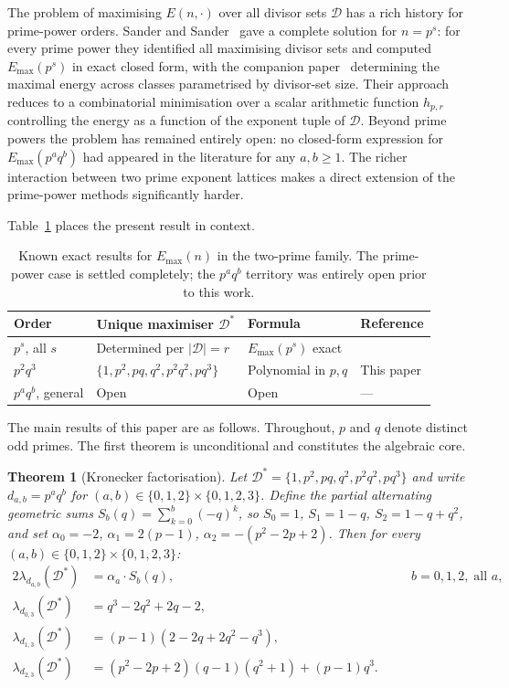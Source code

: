 \documentclass[12pt,a4paper]{article}
\theoremstyle{plain}
\newtheorem{theorem}{Theorem}[section]
\theoremstyle{definition}
\newcommand{\Emax}{E_{\max}}
\newcommand{\Dstar}{\mathcal{D}^*}
\begin{document}
The problem of maximising $E(n,\cdot)$ over all divisor sets $\mathcal{D}$
has a rich history for prime-power orders.  Sander and
Sander~\cite{SanderS2011a,SanderS2011b,SanderS2013} gave a complete
solution for $n=p^s$: for every prime power they identified all maximising
divisor sets and computed $\Emax(p^s)$ in exact closed form, with the
companion paper~\cite{SanderS2012} determining the maximal energy across
classes parametrised by divisor-set size.  Their approach reduces to a
combinatorial minimisation over a scalar arithmetic function $h_{p,r}$
controlling the energy as a function of the exponent tuple of $\mathcal{D}$.
Beyond prime powers the problem has remained entirely open: no closed-form
expression for $\Emax(p^aq^b)$ had appeared in the literature for any
$a,b\ge1$.  The richer interaction between two prime exponent lattices
makes a direct extension of the prime-power methods significantly harder.

Table~\ref{tab:known} places the present result in context.

\begin{table}[h]
\centering
\caption{Known exact results for $\Emax(n)$ in the two-prime family.
The prime-power case is settled completely; the $p^aq^b$ territory was
entirely open prior to this work.}
\label{tab:known}
\begin{tabular}{llll}
\toprule
Order & Unique maximiser $\Dstar$ & Formula & Reference \\
\midrule
$p^s$, all $s$ & Determined per $|\mathcal{D}|=r$ & $\Emax(p^s)$ exact
  & \cite{SanderS2011a,SanderS2011b,SanderS2013} \\
$p^2q^3$ & $\{1,p^2,pq,q^2,p^2q^2,pq^3\}$ & Polynomial in $p,q$
  & This paper \\
$p^aq^b$, general & Open & Open & --- \\
\bottomrule
\end{tabular}
\end{table}

The main results of this paper are as follows.  Throughout, $p$ and $q$
denote distinct odd primes.  The first theorem is unconditional and
constitutes the algebraic core.

\begin{theorem}[Kronecker factorisation]\label{thm:kronecker}
Let $\Dstar=\{1,p^2,pq,q^2,p^2q^2,pq^3\}$ and write $d_{a,b}=p^aq^b$
for $(a,b)\in\{0,1,2\}\times\{0,1,2,3\}$.  Define the partial alternating
geometric sums $S_b(q)=\sum_{k=0}^{b}(-q)^k$, so $S_0=1$, $S_1=1-q$,
$S_2=1-q+q^2$, and set $\alpha_0=-2$, $\alpha_1=2(p-1)$,
$\alpha_2=-(p^2-2p+2)$.  Then for every
$(a,b)\in\{0,1,2\}\times\{0,1,2,3\}$:
\begin{alignat}{2}
  \lambda_{d_{a,b}}(\Dstar) &= \alpha_a\cdot S_b(q),
  &&\quad b=0,1,2,\;\text{all }a,\label{eq:lam-b012}\\
  \lambda_{d_{0,3}}(\Dstar) &= q^3-2q^2+2q-2,
  &&\quad \label{eq:lam-03}\\
  \lambda_{d_{1,3}}(\Dstar) &= (p-1)(2-2q+2q^2-q^3),
  &&\quad \label{eq:lam-13}\\
  \lambda_{d_{2,3}}(\Dstar) &= (p^2-2p+2)(q-1)(q^2+1)+(p-1)q^3.
  &&\quad \label{eq:lam-23}
\end{alignat}
\end{theorem}
\end{document}
